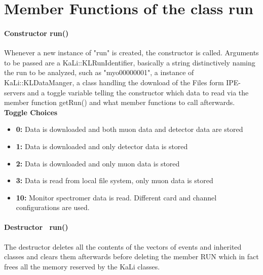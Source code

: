   \section{Member Functions of the class {\bf run}}
  \label{ch:Analysis software:sec:methods of the class run}
  
    \paragraph{Constructor run()}
    \label{ch:Analysis software:sec:methods of the class run:subsec:Constructor}
    Whenever a new instance of "run" is created, the constructor is called. Arguments to be passed are a KaLi::KLRunIdentifier, basically a string distinctively naming the run to be analyzed, such as "myo00000001", a instance of KaLi::KLDataManger, a class handling the download of the Files form IPE-servers and a toggle variable telling the constructor which data to read via the member function getRun() and what member functions to call afterwards.
    {\bf Toggle Choices}
    	\begin{itemize}
    		\item {\bf 0:} Data is downloaded and both muon data and detector data are stored
    		\item {\bf 1:} Data is downloaded and only detector data is stored
    		\item {\bf 2:} Data is downloaded and only muon data is stored
    		\item {\bf 3:} Data is read from local file system, only muon data is stored
    		\item {\bf  10:} Monitor spectromer data is read. Different card and channel configurations are used.
    	
    	\end{itemize}

    
    \paragraph{Destructor ~run()}
    \label{ch:Analysis software:sec:methods of the class run:subsec:destructor}
    The destructor deletes all the contents of the vectors of events and inherited classes and clears them afterwards before deleting the member RUN which in fact frees all the memory reserved by the KaLi classes.
    

